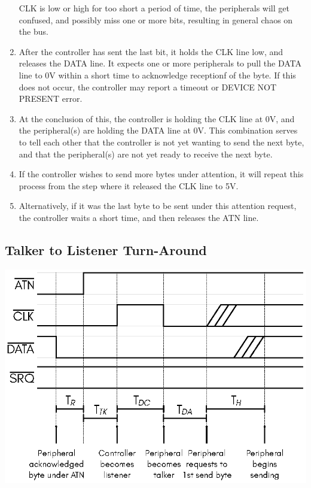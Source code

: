 \begin{enumerate}
  CLK is low or high for too short a period of time, the peripherals
  will get confused, and possibly miss one or more bits, resulting
  in general chaos on the bus.
\item After the controller has sent the last bit, it holds the CLK
  line low, and releases the DATA line. It expects one or more
  peripherals to pull the DATA line to 0V within a short time to
  acknowledge receptionf of the byte. If this does not occur, the
  controller may report a timeout or DEVICE NOT PRESENT error.
\item At the conclusion of this, the controller is holding the
  CLK line at 0V, and the peripheral(s) are holding the DATA
  line at 0V. This combination serves to tell each other that
  the controller is not yet wanting to send the next byte, and
  that the peripheral(s) are not yet ready to receive the next
  byte.
\item If the controller wishes to send more bytes under
  attention, it will repeat this process from the step where
  it released the CLK line to 5V.
\item Alternatively, if it was the last byte to be sent
  under this attention request, the controller waits a short
  time, and then releases the ATN line.
\end{enumerate}

\subsection{Talker to Listener Turn-Around}

\begin{center}
\includegraphics{images/IEC-Timing-Diagrams/IEC-Timing-Diagram-TurnAround}
\end{center}

